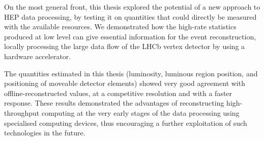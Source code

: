 On the most general front, this thesis explored the potential of a new approach to HEP data processing, by testing it on quantities that could directly be measured with the available resources. We demonstrated how the high-rate statistics produced at low level can give essential information for the event reconstruction, locally processing the large data flow of the LHCb vertex detector by using a hardware accelerator. 

The quantities estimated in this thesis (luminosity, luminous region position, and positioning of moveable detector elements) showed very good agreement with offline-reconstructed values, at a competitive resolution and with a faster response. These results demonstrated the advantages of reconstructing high-throughput computing at the very early stages of the data processing using specialised computing devices, thus encouraging a further exploitation of such technologies in the future.


